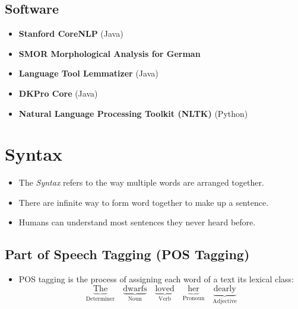         \subsection{Software} %
            \begin{itemize}
            	\item \textbf{Stanford CoreNLP} (Java)
            	\item \textbf{SMOR Morphological Analysis for German}
            	\item \textbf{Language Tool Lemmatizer} (Java)
            	\item \textbf{DKPro Core} (Java)
            	\item \textbf{Natural Language Processing Toolkit (NLTK)} (Python)
            \end{itemize}

    \section{Syntax} %
        \begin{itemize}
        	\item The \textit{Syntax} refers to the way multiple words are arranged together.
        	\item There are infinite way to form word together to make up a sentence.
        	\item Humans can understand most sentences they never heard before.
        \end{itemize}

        \subsection{Part of Speech Tagging (POS Tagging)} %
            \begin{itemize}
            	\item POS tagging is the process of assigning each word of a text its lexical class:
            		\begin{equation*}
                		\underbrace{\text{The}}_\text{Determiner} \quad \underbrace{\text{dwarfs}}_\text{Noun} \quad \underbrace{\text{loved}}_\text{Verb} \quad \underbrace{\text{her}}_\text{Pronoun} \quad \underbrace{\text{dearly}}_\text{Adjective}
            		\end{equation*}
            \end{itemize}

